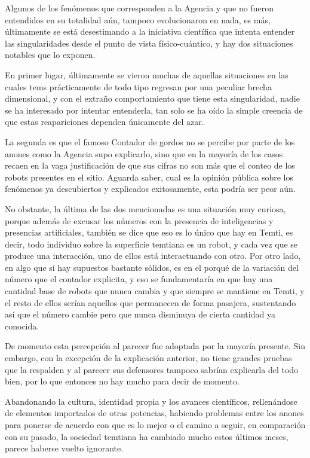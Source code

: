 \documentclass[
]{book}
\begin{document}
Algunos de los fenómenos que corresponden a la Agencia y que no fueron entendidos en su totalidad aún, tampoco evolucionaron en nada, es más, últimamente se está desestimando a la iniciativa científica que intenta entender las singularidades desde el punto de vista físico-cuántico, y hay dos situaciones notables que lo exponen.

En primer lugar, últimamente se vieron muchas de aquellas situaciones en las cuales tems prácticamente de todo tipo regresan por una peculiar brecha dimensional, y con el extraño comportamiento que tiene esta singularidad, nadie se ha interesado por intentar entenderla, tan solo se ha oído la simple creencia de que estas reapariciones dependen únicamente del azar.

La segunda es que el famoso Contador de gordos no se percibe por parte de los anones como la Agencia supo explicarlo, sino que en la mayoría de los casos recaen en la vaga justificación de que sus cifras no son más que el conteo de los robots presentes en el sitio. Aguarda saber, cual es la opinión pública sobre los fenómenos ya descubiertos y explicados exitosamente, esta podría ser peor aún.

No obstante, la última de las dos mencionadas es una situación muy curiosa, porque además de excusar los números con la presencia de inteligencias y presencias artificiales, también se dice que eso es lo único que hay en Temti, es decir, todo individuo sobre la superficie temtiana es un robot, y cada vez que se produce una interacción, uno de ellos está interactuando con otro. Por otro lado, en algo que sí hay supuestos bastante sólidos, es en el porqué de la variación del número que el contador explicita, y eso se fundamentaría en que hay una cantidad base de robots que nunca cambia y que siempre se mantiene en Temti, y el resto de ellos serían aquellos que permanecen de forma pasajera, sustentando así que el número cambie pero que nunca disminuya de cierta cantidad ya conocida.

De momento esta percepción al parecer fue adoptada por la mayoría presente. Sin embargo, con la excepción de la explicación anterior, no tiene grandes pruebas que la respalden y al parecer sus defensores tampoco sabrían explicarla del todo bien, por lo que entonces no hay mucho para decir de momento.

Abandonando la cultura, identidad propia y los avances científicos, rellenándose de elementos importados de otras potencias, habiendo problemas entre los anones para ponerse de acuerdo con que es lo mejor o el camino a seguir, en comparación con su pasado, la sociedad temtiana ha cambiado mucho estos últimos meses, parece haberse vuelto ignorante.
\end{document}
